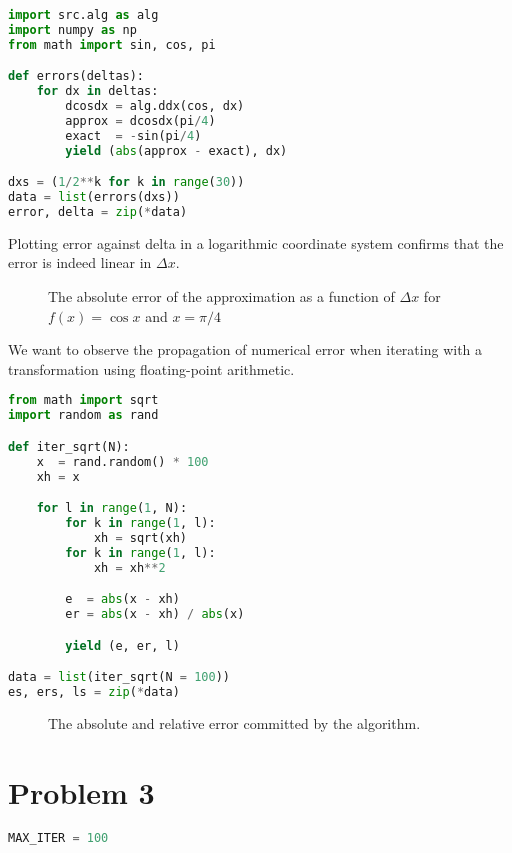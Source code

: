 \documentclass[12pt]{article}
\newcommand{\subtask}[1]{{\bf #1.}}
\begin{document}
\begin{multicols}{2}
\begin{lstlisting}[language=Python, caption={Using the differentiation program}]
import src.alg as alg
import numpy as np
from math import sin, cos, pi

def errors(deltas):
    for dx in deltas:
        dcosdx = alg.ddx(cos, dx)
        approx = dcosdx(pi/4)
        exact  = -sin(pi/4)
        yield (abs(approx - exact), dx)

dxs = (1/2**k for k in range(30))
data = list(errors(dxs))
error, delta = zip(*data)
\end{lstlisting}
Plotting {\ttfamily error} against {\ttfamily delta} in
a logarithmic coordinate system confirms that the error
is indeed linear in $\Delta x$.

\begin{figure}[H]
\centering

\caption{
    The absolute error of the approximation as a function
    of $\Delta x$ for $f(x) = \cos x$ and $x = \pi/4$
}
\end{figure}
\noindent



\noindent\subtask{b} We want to observe the propagation of numerical
error when iterating with a transformation using floating-point
arithmetic.
\begin{lstlisting}[language=Python, caption={{Iterating with} {\ttfamily sqrt}}]
from math import sqrt
import random as rand

def iter_sqrt(N):
    x  = rand.random() * 100
    xh = x

    for l in range(1, N):
        for k in range(1, l):
            xh = sqrt(xh)
        for k in range(1, l):
            xh = xh**2

        e  = abs(x - xh)
        er = abs(x - xh) / abs(x)

        yield (e, er, l)

data = list(iter_sqrt(N = 100))
es, ers, ls = zip(*data)
\end{lstlisting}

\begin{figure}[H]
\centering

\caption{
    The absolute and relative error committed by the algorithm.
}
\end{figure}
\noindent

\section*{Problem 3}
\begin{lstlisting}[language=Python, caption={Bisection and Newtons method}]
MAX_ITER = 100


\end{lstlisting}
\end{multicols}
\end{document}
